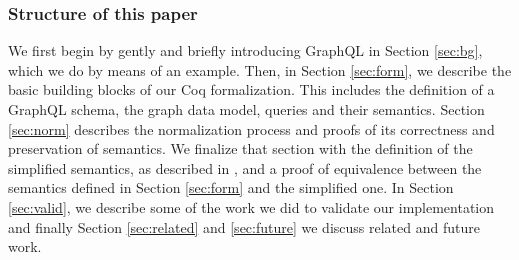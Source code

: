 \subsubsection*{Structure of this paper}

We first begin by gently and briefly introducing GraphQL in Section \ref{sec:bg}, which we do by means of an example. Then, in Section \ref{sec:form}, we describe the basic building blocks of our Coq formalization. This includes the definition of a GraphQL schema, the graph data model, queries and their semantics. Section \ref{sec:norm} describes the normalization process and proofs of its correctness and preservation of semantics. We finalize that section with the definition of the simplified semantics, as described in \HP{}, and a proof of equivalence between the semantics defined in Section \ref{sec:form} and the simplified one. In Section \ref{sec:valid}, we describe some of the work we did to validate our implementation and finally Section \ref{sec:related} and \ref{sec:future} we discuss related and future work.
